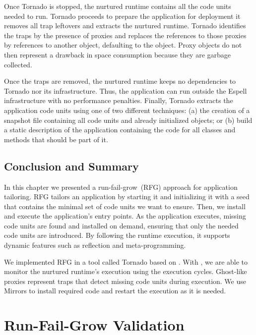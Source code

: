 Once Tornado is stopped, the nurtured runtime contains all the code units needed to run. Tornado proceeds to prepare the application for deployment \ie it removes all trap leftovers and extracts the nurtured runtime. Tornado identifies the traps by the presence of proxies and replaces the references to those proxies by references to another object, defaulting to the  object. Proxy objects do not then represent a drawback in space consumption because they are garbage collected. %

Once the traps are removed, the nurtured runtime keeps no dependencies to Tornado nor its infrastructure. Thus, the application can run outside the Espell infrastructure with no performance penalties. Finally, Tornado extracts the application code units using one of two different techniques: (a) the creation of a snapshot file containing all code units and already initialized objects; or (b) build a static description of the application containing the code for all classes and methods that should be part of it.

\section{Conclusion and Summary}

In this chapter we presented a run-fail-grow~(RFG) approach for application tailoring. RFG tailors an application by starting it and initializing it with a seed that contains the minimal set of code units we want to ensure. Then, we install and execute the application's entry points. As the application executes, missing code units are found and installed on demand, ensuring that only the needed code units are introduced. By following the runtime execution, it supports dynamic features such as reflection and meta-programming.

We implemented RFG in a tool called Tornado based on \Vtt. With \Vtt, we are able to monitor the nurtured runtime's execution using the execution cycles. Ghost-like proxies represent traps that detect missing code units during execution. We use Mirrors to install required code and restart the execution as it is needed.

\chapter{Run-Fail-Grow Validation}
\minitoc
\introduction

